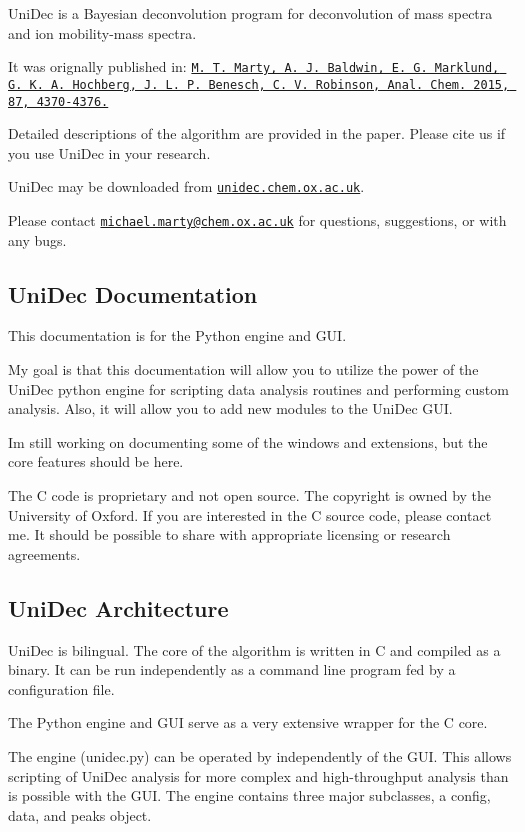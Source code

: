 Uni\+Dec is a Bayesian deconvolution program for deconvolution of mass spectra and ion mobility-\/mass spectra.

It was orignally published in\+: \href{http://pubs.acs.org/doi/abs/10.1021/acs.analchem.5b00140}{\tt M. T. Marty, A. J. Baldwin, E. G. Marklund, G. K. A. Hochberg, J. L. P. Benesch, C. V. Robinson, Anal. Chem. 2015, 87, 4370-\/4376.}

Detailed descriptions of the algorithm are provided in the paper. Please cite us if you use Uni\+Dec in your research.

Uni\+Dec may be downloaded from \href{http://unidec.chem.ox.ac.uk/}{\tt unidec.\+chem.\+ox.\+ac.\+uk}.

Please contact \href{mailto:michael.marty@chem.ox.ac.uk}{\tt michael.\+marty@chem.\+ox.\+ac.\+uk} for questions, suggestions, or with any bugs.

\subsection*{Uni\+Dec Documentation}

This documentation is for the Python engine and G\+U\+I.

My goal is that this documentation will allow you to utilize the power of the Uni\+Dec python engine for scripting data analysis routines and performing custom analysis. Also, it will allow you to add new modules to the Uni\+Dec G\+U\+I.

I\textquotesingle{}m still working on documenting some of the windows and extensions, but the core features should be here.

The C code is proprietary and not open source. The copyright is owned by the University of Oxford. If you are interested in the C source code, please contact me. It should be possible to share with appropriate licensing or research agreements.

\subsection*{Uni\+Dec Architecture}

Uni\+Dec is bilingual. The core of the algorithm is written in C and compiled as a binary. It can be run independently as a command line program fed by a configuration file.

The Python engine and G\+U\+I serve as a very extensive wrapper for the C core.

The engine (unidec.\+py) can be operated by independently of the G\+U\+I. This allows scripting of Uni\+Dec analysis for more complex and high-\/throughput analysis than is possible with the G\+U\+I. The engine contains three major subclasses, a config, data, and peaks object.

